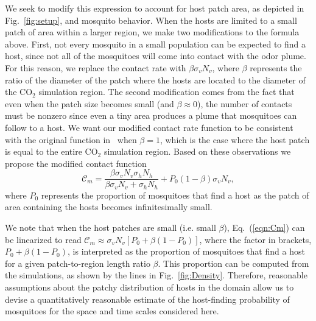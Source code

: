 \documentclass[10pt]{article}
\begin{document}
We seek to modify this expression to account for host patch area, as depicted in Fig.~\ref{fig:setup}, and mosquito behavior.  When the hosts are limited to a small patch of area within a larger region, we make two modifications to the formula above.  First, not every mosquito in a small population can be expected to find a host, since not all of the mosquitoes will come into contact with the odor plume.  For this reason, we replace the contact rate with $\beta\sigma_v N_v$, where $\beta$ represents the ratio of the diameter of the patch where the hosts are located to the diameter of the $\mbox{CO}_2$ simulation region.   The second modification comes from the fact that even when the patch size becomes small (and $\beta\approx0$), the number of contacts must be nonzero since even a tiny area produces a plume that mosquitoes can follow to a host. 
We want our modified contact rate function to be consistent with the original function in~\cite{Chitnis2006} when
$\beta=1$, which is the case where the host patch is equal to the entire $\mbox{CO}_2$ simulation region. 
Based on these observations we propose the modified contact function
\begin{equation}
	\mathcal{C}_m 	= \frac{\beta\sigma_v N_v\sigma_h N_h}{\beta\sigma_v N_v + \sigma_h N_h} + P_0(1-\beta)\sigma_v N_v, \label{eqn:Cm}
\end{equation}
where $P_0$ represents the proportion of
mosquitoes that find a host as the patch of area containing the
hosts becomes infinitesimally small.

We note that when the host patches are small (i.e. small $\beta$), Eq.~(\ref{eqn:Cm}) can
be linearized to read $\mathcal{C}_m \approx \sigma_v N_v [ P_0 + \beta(1-P_0) ]$, where
the factor in brackets, $P_0 + \beta(1-P_0)$, is interpreted as the proportion of mosquitoes 
that find a host for a given patch-to-region length ratio $\beta$.  This proportion can be computed from the 
simulations, as shown by the lines in Fig.~\ref{fig:Density}.
Therefore, reasonable assumptions about the patchy distribution of hosts in the domain allow us to devise a quantitatively reasonable estimate of the host-finding probability of mosquitoes for the space and time scales considered here. 
\end{document}

